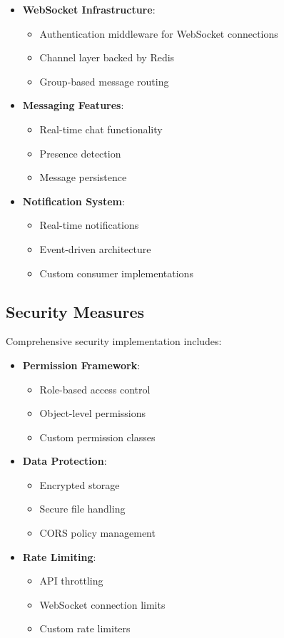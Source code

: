 \begin{itemize}
  \item \textbf{WebSocket Infrastructure}:
    \begin{itemize}
      \item Authentication middleware for WebSocket connections
      \item Channel layer backed by Redis
      \item Group-based message routing
    \end{itemize}
    
  \item \textbf{Messaging Features}:
    \begin{itemize}
      \item Real-time chat functionality
      \item Presence detection
      \item Message persistence
    \end{itemize}
    
  \item \textbf{Notification System}:
    \begin{itemize}
      \item Real-time notifications
      \item Event-driven architecture
      \item Custom consumer implementations
    \end{itemize}
\end{itemize}

\subsection{Security Measures}
Comprehensive security implementation includes:

\begin{itemize}
  \item \textbf{Permission Framework}:
    \begin{itemize}
      \item Role-based access control
      \item Object-level permissions
      \item Custom permission classes
    \end{itemize}
    
  \item \textbf{Data Protection}:
    \begin{itemize}
      \item Encrypted storage
      \item Secure file handling
      \item CORS policy management
    \end{itemize}
    
  \item \textbf{Rate Limiting}:
    \begin{itemize}
      \item API throttling
      \item WebSocket connection limits
      \item Custom rate limiters
    \end{itemize}
\end{itemize}

